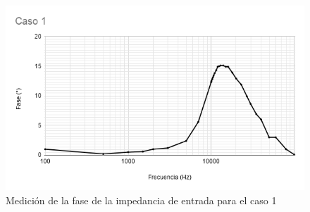 \begin{figure}[H]
\begin{centering}
\includegraphics[scale=0.5]{../Ex1/iA/Resources1a/zinpp1_med}
\par\end{centering}
\caption{Medición de la fase de la impedancia de entrada para el caso 1}

\end{figure}

